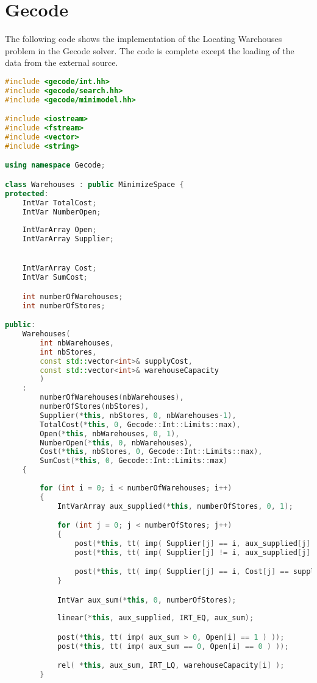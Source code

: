 \section{Gecode}

The following code shows the implementation of the Locating Warehouses problem in the
Gecode solver. The code is complete except the loading of the data from the external source.

\begin{lstlisting}[language=C++]
#include <gecode/int.hh>
#include <gecode/search.hh>
#include <gecode/minimodel.hh>

#include <iostream>
#include <fstream>
#include <vector>
#include <string>

using namespace Gecode;

class Warehouses : public MinimizeSpace {
protected: 
	IntVar TotalCost;
	IntVar NumberOpen;
	
	IntVarArray Open;
	IntVarArray Supplier;


	IntVarArray Cost;
	IntVar SumCost;

	int numberOfWarehouses;
	int numberOfStores;

public:
	Warehouses(
		int nbWarehouses,
		int nbStores,
		const std::vector<int>& supplyCost, 
		const std::vector<int>& warehouseCapacity
		) 
	: 
		numberOfWarehouses(nbWarehouses),
		numberOfStores(nbStores),
		Supplier(*this, nbStores, 0, nbWarehouses-1),
		TotalCost(*this, 0, Gecode::Int::Limits::max),
		Open(*this, nbWarehouses, 0, 1),
		NumberOpen(*this, 0, nbWarehouses),
		Cost(*this, nbStores, 0, Gecode::Int::Limits::max),
		SumCost(*this, 0, Gecode::Int::Limits::max)
	{
		
		for (int i = 0; i < numberOfWarehouses; i++)
		{
			IntVarArray aux_supplied(*this, numberOfStores, 0, 1);

			for (int j = 0; j < numberOfStores; j++)
			{
				post(*this, tt( imp( Supplier[j] == i, aux_supplied[j] == 1) ));
				post(*this, tt( imp( Supplier[j] != i, aux_supplied[j] == 0) ));

				post(*this, tt( imp( Supplier[j] == i, Cost[j] == supplyCost[i + j * numberOfWarehouses]) ));
			}

			IntVar aux_sum(*this, 0, numberOfStores);
			
			linear(*this, aux_supplied, IRT_EQ, aux_sum);

			post(*this, tt( imp( aux_sum > 0, Open[i] == 1 ) ));
			post(*this, tt( imp( aux_sum == 0, Open[i] == 0 ) ));

			rel( *this, aux_sum, IRT_LQ, warehouseCapacity[i] );
		}
		

\end{lstlisting}
